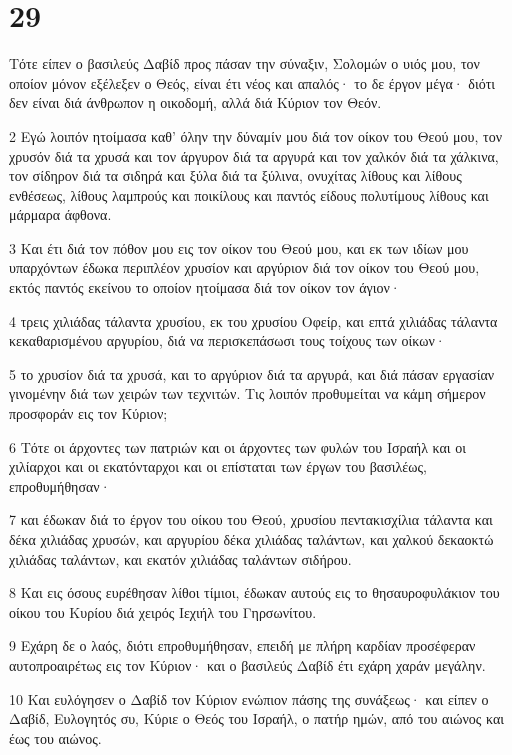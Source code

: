 \chapter{29}

\par Τότε είπεν ο βασιλεύς Δαβίδ προς πάσαν την σύναξιν, Σολομών ο υιός μου, τον οποίον μόνον εξέλεξεν ο Θεός, είναι έτι νέος και απαλός· το δε έργον μέγα· διότι δεν είναι διά άνθρωπον η οικοδομή, αλλά διά Κύριον τον Θεόν.
\par 2 Εγώ λοιπόν ητοίμασα καθ' όλην την δύναμίν μου διά τον οίκον του Θεού μου, τον χρυσόν διά τα χρυσά και τον άργυρον διά τα αργυρά και τον χαλκόν διά τα χάλκινα, τον σίδηρον διά τα σιδηρά και ξύλα διά τα ξύλινα, ονυχίτας λίθους και λίθους ενθέσεως, λίθους λαμπρούς και ποικίλους και παντός είδους πολυτίμους λίθους και μάρμαρα άφθονα.
\par 3 Και έτι διά τον πόθον μου εις τον οίκον του Θεού μου, και εκ των ιδίων μου υπαρχόντων έδωκα περιπλέον χρυσίον και αργύριον διά τον οίκον του Θεού μου, εκτός παντός εκείνου το οποίον ητοίμασα διά τον οίκον τον άγιον·
\par 4 τρεις χιλιάδας τάλαντα χρυσίου, εκ του χρυσίου Οφείρ, και επτά χιλιάδας τάλαντα κεκαθαρισμένου αργυρίου, διά να περισκεπάσωσι τους τοίχους των οίκων·
\par 5 το χρυσίον διά τα χρυσά, και το αργύριον διά τα αργυρά, και διά πάσαν εργασίαν γινομένην διά των χειρών των τεχνιτών. Τις λοιπόν προθυμείται να κάμη σήμερον προσφοράν εις τον Κύριον;
\par 6 Τότε οι άρχοντες των πατριών και οι άρχοντες των φυλών του Ισραήλ και οι χιλίαρχοι και οι εκατόνταρχοι και οι επίσταται των έργων του βασιλέως, επροθυμήθησαν·
\par 7 και έδωκαν διά το έργον του οίκου του Θεού, χρυσίου πεντακισχίλια τάλαντα και δέκα χιλιάδας χρυσών, και αργυρίου δέκα χιλιάδας ταλάντων, και χαλκού δεκαοκτώ χιλιάδας ταλάντων, και εκατόν χιλιάδας ταλάντων σιδήρου.
\par 8 Και εις όσους ευρέθησαν λίθοι τίμιοι, έδωκαν αυτούς εις το θησαυροφυλάκιον του οίκου του Κυρίου διά χειρός Ιεχιήλ του Γηρσωνίτου.
\par 9 Εχάρη δε ο λαός, διότι επροθυμήθησαν, επειδή με πλήρη καρδίαν προσέφεραν αυτοπροαιρέτως εις τον Κύριον· και ο βασιλεύς Δαβίδ έτι εχάρη χαράν μεγάλην.
\par 10 Και ευλόγησεν ο Δαβίδ τον Κύριον ενώπιον πάσης της συνάξεως· και είπεν ο Δαβίδ, Ευλογητός συ, Κύριε ο Θεός του Ισραήλ, ο πατήρ ημών, από του αιώνος και έως του αιώνος.
